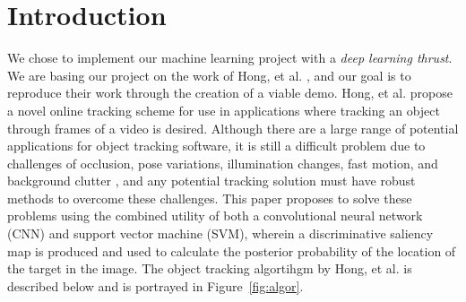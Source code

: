 \documentclass{sig-alternate-05-2015}
\begin{document}
\section{Introduction}
We chose to implement our machine learning project with a \textit{deep learning thrust}.
We are basing our project on the work of Hong, et al. \cite{hong2015online}, and our goal is to reproduce their work through the creation of a viable demo.
Hong, et al. propose a novel online tracking scheme for use in applications where tracking an object through frames of a video is desired.
Although there are a large range of potential applications for object tracking software, it is still a difficult problem due to challenges of occlusion, pose variations, illumination changes, fast motion, and background clutter \cite{hong2015online}, and any potential tracking solution must have robust methods to overcome these challenges.
This paper proposes to solve these problems using the combined utility of both a convolutional neural network (CNN) and support vector machine (SVM), wherein a discriminative saliency map is produced and used to calculate the posterior probability of the location of the target in the image.
The object tracking algortihgm by Hong, et al. is described below and is portrayed in Figure~\ref{fig:algor}.
\end{document}
